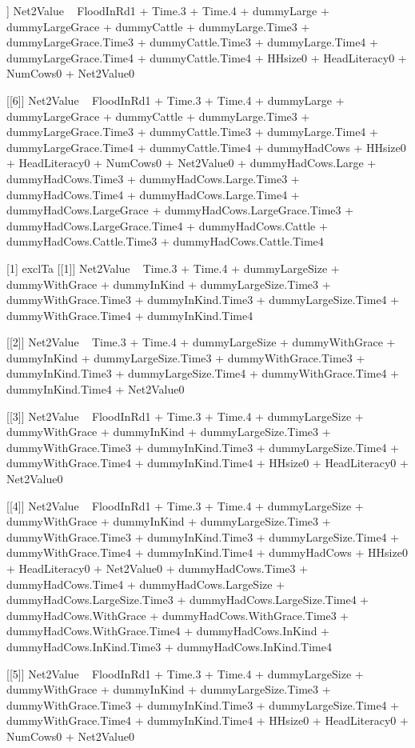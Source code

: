 \begin{Schunk}
\begin{Soutput}
[[5]]
Net2Value ~ FloodInRd1 + Time.3 + Time.4 + dummyLarge + dummyLargeGrace + 
    dummyCattle + dummyLarge.Time3 + dummyLargeGrace.Time3 + 
    dummyCattle.Time3 + dummyLarge.Time4 + dummyLargeGrace.Time4 + 
    dummyCattle.Time4 + HHsize0 + HeadLiteracy0 + NumCows0 + 
    Net2Value0

[[6]]
Net2Value ~ FloodInRd1 + Time.3 + Time.4 + dummyLarge + dummyLargeGrace + 
    dummyCattle + dummyLarge.Time3 + dummyLargeGrace.Time3 + 
    dummyCattle.Time3 + dummyLarge.Time4 + dummyLargeGrace.Time4 + 
    dummyCattle.Time4 + dummyHadCows + HHsize0 + HeadLiteracy0 + 
    NumCows0 + Net2Value0 + dummyHadCows.Large + dummyHadCows.Time3 + 
    dummyHadCows.Large.Time3 + dummyHadCows.Time4 + dummyHadCows.Large.Time4 + 
    dummyHadCows.LargeGrace + dummyHadCows.LargeGrace.Time3 + 
    dummyHadCows.LargeGrace.Time4 + dummyHadCows.Cattle + dummyHadCows.Cattle.Time3 + 
    dummyHadCows.Cattle.Time4

[1] exclTa
[[1]]
Net2Value ~ Time.3 + Time.4 + dummyLargeSize + dummyWithGrace + 
    dummyInKind + dummyLargeSize.Time3 + dummyWithGrace.Time3 + 
    dummyInKind.Time3 + dummyLargeSize.Time4 + dummyWithGrace.Time4 + 
    dummyInKind.Time4

[[2]]
Net2Value ~ Time.3 + Time.4 + dummyLargeSize + dummyWithGrace + 
    dummyInKind + dummyLargeSize.Time3 + dummyWithGrace.Time3 + 
    dummyInKind.Time3 + dummyLargeSize.Time4 + dummyWithGrace.Time4 + 
    dummyInKind.Time4 + Net2Value0

[[3]]
Net2Value ~ FloodInRd1 + Time.3 + Time.4 + dummyLargeSize + dummyWithGrace + 
    dummyInKind + dummyLargeSize.Time3 + dummyWithGrace.Time3 + 
    dummyInKind.Time3 + dummyLargeSize.Time4 + dummyWithGrace.Time4 + 
    dummyInKind.Time4 + HHsize0 + HeadLiteracy0 + Net2Value0

[[4]]
Net2Value ~ FloodInRd1 + Time.3 + Time.4 + dummyLargeSize + dummyWithGrace + 
    dummyInKind + dummyLargeSize.Time3 + dummyWithGrace.Time3 + 
    dummyInKind.Time3 + dummyLargeSize.Time4 + dummyWithGrace.Time4 + 
    dummyInKind.Time4 + dummyHadCows + HHsize0 + HeadLiteracy0 + 
    Net2Value0 + dummyHadCows.Time3 + dummyHadCows.Time4 + dummyHadCows.LargeSize + 
    dummyHadCows.LargeSize.Time3 + dummyHadCows.LargeSize.Time4 + 
    dummyHadCows.WithGrace + dummyHadCows.WithGrace.Time3 + dummyHadCows.WithGrace.Time4 + 
    dummyHadCows.InKind + dummyHadCows.InKind.Time3 + dummyHadCows.InKind.Time4

[[5]]
Net2Value ~ FloodInRd1 + Time.3 + Time.4 + dummyLargeSize + dummyWithGrace + 
    dummyInKind + dummyLargeSize.Time3 + dummyWithGrace.Time3 + 
    dummyInKind.Time3 + dummyLargeSize.Time4 + dummyWithGrace.Time4 + 
    dummyInKind.Time4 + HHsize0 + HeadLiteracy0 + NumCows0 + 
    Net2Value0


\end{Soutput}
\end{Schunk}
